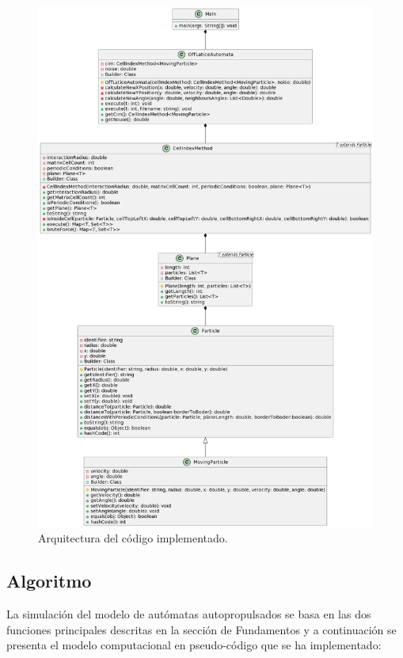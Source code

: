 \documentclass[11pt]{article}
\begin{document}
            \begin{figure}[htbp]
                \centering
                \includegraphics[height=0.69\textheight]{./Architecture.png}
                \caption{Arquitectura del código implementado.}
                \label{fig:my_png}
            \end{figure}

        \subsection{Algoritmo}

            La simulación del modelo de autómatas autopropulsados se basa en las dos funciones principales descritas en la sección
            de Fundamentos y a continuación se presenta el modelo computacional en pseudo-código que se ha implementado:
\end{document}
